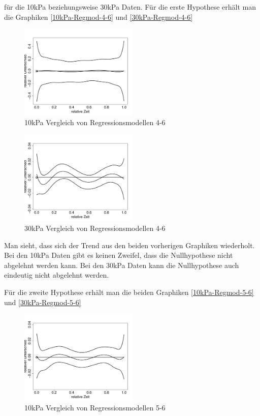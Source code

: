 \documentclass[12pt,a4paper]{article}
\theoremstyle{definition}
\theoremstyle{definition}
\theoremstyle{definition}
\theoremstyle{definition}
\begin{document}
für die 10kPa beziehungsweise 30kPa Daten. Für die erste Hypothese erhält man die Graphiken \eqref{10kPa-Regmod-4-6} und \eqref{30kPa-Regmod-4-6}

\begin{figure}[H] 
  \centering
     \includegraphics[width=0.5\textwidth]{10kPa-poly-KB-4-6.pdf}
  \caption{10kPa Vergleich von Regressionsmodellen 4-6}
  \label{10kPa-Regmod-4-6}
\end{figure}

\begin{figure}[H] 
  \centering
     \includegraphics[width=0.5\textwidth]{30kPa-poly-KB-4-6.pdf}
  \caption{30kPa Vergleich von Regressionsmodellen 4-6}
  \label{30kPa-Regmod-4-6}
\end{figure}

Man sieht, dass sich der Trend aus den beiden vorherigen Graphiken wiederholt. Bei den 10kPa Daten gibt es keinen Zweifel, dass die Nullhypothese nicht abgelehnt werden kann. Bei den 30kPa Daten kann die Nullhypothese auch eindeutig nicht abgelehnt werden.

Für die zweite Hypothese erhält man die beiden Graphiken \eqref{10kPa-Regmod-5-6} und \eqref{30kPa-Regmod-5-6}

\begin{figure}[H] 
  \centering
     \includegraphics[width=0.5\textwidth]{30kPa-poly-KB-5-6.pdf}
  \caption{10kPa Vergleich von Regressionsmodellen 5-6}
  \label{10kPa-Regmod-5-6}
\end{figure}
\end{document}
